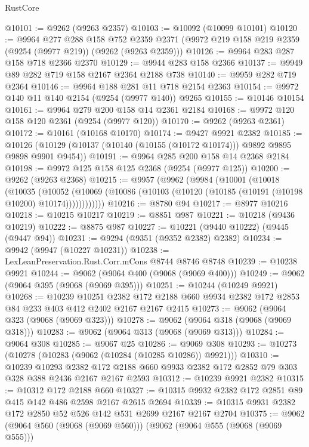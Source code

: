 \begin{lexlean}{RustCore}
\begin{coremodule}
@10101 := @9262 (@9263 @2357)
@10103 := @10092 (@10099 @10101)
@10120 := @9964
    @277
    @288
    @158
    @752
    @2359
    @2371
    (@9972 @219 @158 @219 @2359 (@9254 (@9977 @219)) (@9262 (@9263 @2359)))
@10126 := @9964 @283 @287 @158 @718 @2366 @2370
@10129 := @9944 @283 @158 @2366
@10137 := @9949 @89 @282 @719 @158 @2167 @2364 @2188 @738
@10140 := @9959 @282 @719 @2364
@10146 := @9964 @188 @281 @11 @718 @2154 @2363
@10154 := @9972 @140 @11 @140 @2154 (@9254 (@9977 @140)) @9265
@10155 := @10146 @10154
@10161 := @9964 @279 @200 @158 @14 @2361 @2184
@10168 := @9972 @120 @158 @120 @2361 (@9254 (@9977 @120))
@10170 := @9262 (@9263 @2361)
@10172 := @10161 (@10168 @10170)
@10174 := @9427 @9921 @2382
@10185 := @10126 (@10129 (@10137 (@10140 (@10155 (@10172 @10174))) @9892 @9895 @9898 @9901 @9454))
@10191 := @9964 @285 @200 @158 @14 @2368 @2184
@10198 := @9972 @125 @158 @125 @2368 (@9254 (@9977 @125))
@10200 := @9262 (@9263 @2368)
@10215 := @9957
    (@9962
      (@9984
        (@10001
          (@10018
            (@10035
              (@10052
                (@10069 (@10086 (@10103 (@10120 (@10185 (@10191 (@10198 @10200) @10174))))))))))))
@10216 := @8780 @94
@10217 := @8977 @10216
@10218 := @10215 @10217
@10219 := @8851 @987
@10221 := @10218 (@9436 @10219)
@10222 := @8875 @987
@10227 := @10221 (@9440 @10222) (@9445 (@9447 @94))
@10231 := @9294 (@9351 (@9352 @2382) @2382)
@10234 := @9942 (@9947 (@10227 @10231))
@10238 := LexLeanPreservation.Rust.Corr.mCons @8744 @8746 @8748
@10239 := @10238 @9921
@10244 := @9062 (@9064 @400 (@9068 (@9069 @400)))
@10249 := @9062 (@9064 @395 (@9068 (@9069 @395)))
@10251 := @10244 (@10249 @9921)
@10268 := @10239
    @10251
    @2382
    @172
    @2188
    @660
    @9934
    @2382
    @172
    @2853
    @84
    @233
    @403
    @412
    @2402
    @2167
    @2167
    @2415
@10273 := @9062 (@9064 @323 (@9068 (@9069 @323)))
@10278 := @9062 (@9064 @318 (@9068 (@9069 @318)))
@10283 := @9062 (@9064 @313 (@9068 (@9069 @313)))
@10284 := @9064 @308
@10285 := @9067 @25
@10286 := @9069 @308
@10293 := @10273 (@10278 (@10283 (@9062 (@10284 (@10285 @10286)) @9921)))
@10310 := @10239
    @10293
    @2382
    @172
    @2188
    @660
    @9933
    @2382
    @172
    @2852
    @79
    @303
    @328
    @388
    @2436
    @2167
    @2167
    @2593
@10312 := @10239 @9921 @2382
@10315 := @10312 @172 @2188 @660
@10327 := @10315 @9932 @2382 @172 @2851 @89 @415 @142 @486 @2598 @2167 @2615 @2694
@10339 := @10315 @9931 @2382 @172 @2850 @52 @526 @142 @531 @2699 @2167 @2167 @2704
@10375 := @9062
    (@9064 @560 (@9068 (@9069 @560)))
    (@9062
      (@9064 @555 (@9068 (@9069 @555)))

\end{coremodule}
\end{lexlean}
